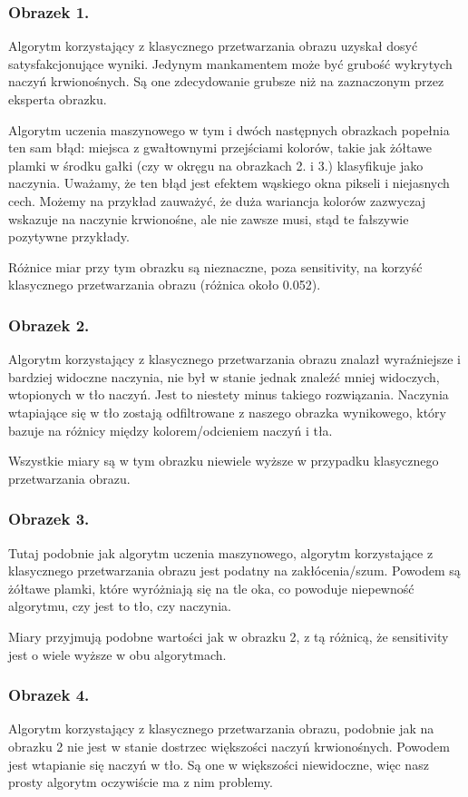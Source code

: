\documentclass[11pt]{article}
\begin{document}
\subsubsection{Obrazek 1.}
Algorytm korzystający z klasycznego przetwarzania obrazu uzyskał dosyć satysfakcjonujące wyniki. Jedynym mankamentem może być grubość wykrytych naczyń krwionośnych. Są one zdecydowanie grubsze niż na zaznaczonym przez eksperta obrazku.

Algorytm uczenia maszynowego w tym i dwóch następnych obrazkach popełnia ten sam błąd: miejsca z gwałtownymi przejściami kolorów, takie jak żółtawe plamki w środku gałki (czy w okręgu na obrazkach 2. i 3.) klasyfikuje jako naczynia.
Uważamy, że ten błąd jest efektem wąskiego okna pikseli i niejasnych cech. Możemy na przykład zauważyć, że duża wariancja kolorów zazwyczaj wskazuje na naczynie krwionośne, ale nie zawsze musi, stąd te fałszywie pozytywne przykłady.

Różnice miar przy tym obrazku są nieznaczne, poza sensitivity, na korzyść klasycznego przetwarzania obrazu (różnica około 0.052).

\subsubsection{Obrazek 2.}
Algorytm korzystający z klasycznego przetwarzania obrazu znalazł wyraźniejsze i bardziej widoczne naczynia, nie był w stanie jednak znaleźć mniej widoczych, wtopionych w tło naczyń. Jest to niestety minus takiego rozwiązania. Naczynia wtapiające się w tło zostają odfiltrowane z naszego obrazka wynikowego, który bazuje na różnicy między kolorem/odcieniem naczyń i tła.

Wszystkie miary są w tym obrazku niewiele wyższe w przypadku klasycznego przetwarzania obrazu.

\subsubsection{Obrazek 3.}
Tutaj podobnie jak algorytm uczenia maszynowego, algorytm korzystające z klasycznego przetwarzania obrazu jest podatny na zakłócenia/szum. Powodem są żółtawe plamki, które wyróżniają się na tle oka, co powoduje niepewność algorytmu, czy jest to tło, czy naczynia.

Miary przyjmują podobne wartości jak w obrazku 2, z tą różnicą, że sensitivity jest o wiele wyższe w obu algorytmach.

\subsubsection{Obrazek 4.}
Algorytm korzystający z klasycznego przetwarzania obrazu, podobnie jak na obrazku 2 nie jest w stanie dostrzec większości naczyń krwionośnych. Powodem jest wtapianie się naczyń w tło. Są one w większości niewidoczne, więc nasz prosty algorytm oczywiście ma z nim problemy.
\end{document}
